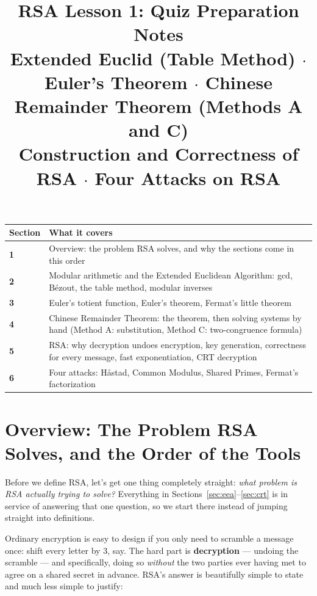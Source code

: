 \documentclass[11pt]{article}
\title{\textbf{RSA Lesson 1: Quiz Preparation Notes}\\[4pt]
\large Extended Euclid (Table Method) $\cdot$ Euler's Theorem $\cdot$ Chinese Remainder Theorem (Methods A and C)\\
Construction and Correctness of RSA $\cdot$ Four Attacks on RSA}
\author{}
\date{}
\theoremstyle{definition}
\theoremstyle{remark}
\begin{document}
\maketitle
\thispagestyle{fancy}
\vspace{-2em}

\begin{center}
\begin{tabular}{@{}>{\bfseries}l >{\raggedright\arraybackslash}p{14.5cm}@{}}
\toprule


Section & What it covers \\
\midrule
1 & Overview: the problem RSA solves, and why the sections come in this order \\
2 & Modular arithmetic and the Extended Euclidean Algorithm: gcd, B\'ezout, the table method, modular inverses \\
3 & Euler's totient function, Euler's theorem, Fermat's little theorem \\
4 & Chinese Remainder Theorem: the theorem, then solving systems by hand (Method A: substitution, Method C: two-congruence formula) \\
5 & RSA: why decryption undoes encryption, key generation, correctness for every message, fast exponentiation, CRT decryption \\
6 & Four attacks: Håstad, Common Modulus, Shared Primes, Fermat's factorization \\
\bottomrule
\end{tabular}
\end{center}

\tableofcontents
\newpage

\section{Overview: The Problem RSA Solves, and the Order of the Tools}\label{sec:overview}

Before we define RSA, let's get one thing completely straight: \emph{what problem is RSA actually trying to solve?} Everything in Sections~\ref{sec:eea}--\ref{sec:crt} is in service of answering that one question, so we start there instead of jumping straight into definitions.


Ordinary encryption is easy to design if you only need to scramble a message once: shift every letter by 3, say. The hard part is \textbf{decryption} — undoing the scramble — and specifically, doing so \emph{without} the two parties ever having met to agree on a shared secret in advance. RSA's answer is beautifully simple to state and much less simple to justify:
\end{document}
